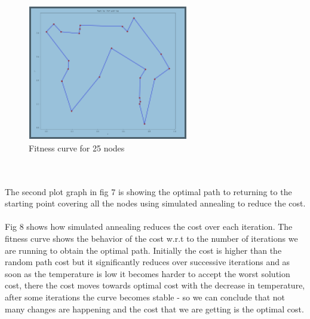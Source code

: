 \documentclass[conference]{IEEEtran}
\begin{document}
\\
\\
\begin{figure}[htbp]
\centerline{\includegraphics[scale=0.8]{apt.png}}
\caption{Fitness curve for 25 nodes}
\label{fig}
\end{figure}
\\
\\

The second plot graph in fig 7 is showing the optimal path to returning to the starting point covering all the nodes using simulated annealing to reduce the cost.
\\
\\
Fig 8 shows how simulated annealing reduces the cost over each iteration. The fitness curve shows the behavior of the cost w.r.t to the number of iterations we are running to obtain the optimal path. Initially the cost is higher than the random path cost but it significantly reduces over successive iterations and as soon as the temperature is low it becomes harder to accept the worst solution cost, there the cost moves towards optimal cost with the decrease in temperature, after some iterations the curve becomes stable - so we can conclude that not many changes are happening and the cost that we are getting is the optimal cost.
\end{document}
